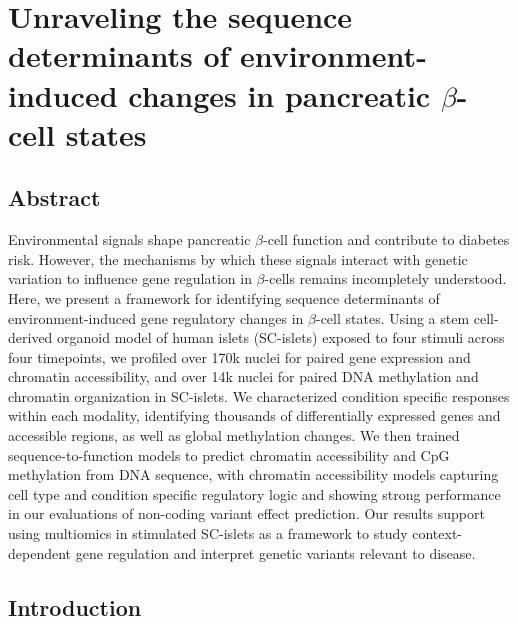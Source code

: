 \chapter{Unraveling the sequence determinants of environment-induced changes in pancreatic $\beta$-cell states}
\label{chap:chapter 3}

\section{Abstract}

Environmental signals shape pancreatic $\beta$-cell function and contribute to diabetes risk. However, the mechanisms by which these signals interact with genetic variation to influence gene regulation in $\beta$-cells remains incompletely understood. Here, we present a framework for identifying sequence determinants of environment-induced gene regulatory changes in $\beta$-cell states. Using a stem cell-derived organoid model of human islets (SC-islets) exposed to four stimuli across four timepoints, we profiled over 170k nuclei for paired gene expression and chromatin accessibility, and over 14k nuclei for paired DNA methylation and chromatin organization in SC-islets. We characterized condition specific responses within each modality, identifying thousands of differentially expressed genes and accessible regions, as well as global methylation changes. We then trained sequence-to-function models to predict chromatin accessibility and CpG methylation from DNA sequence, with chromatin accessibility models capturing cell type and condition specific regulatory logic and showing strong performance in our evaluations of non-coding variant effect prediction. Our results support using multiomics in stimulated SC-islets as a framework to study context-dependent gene regulation and interpret genetic variants relevant to disease.

\section{Introduction}

